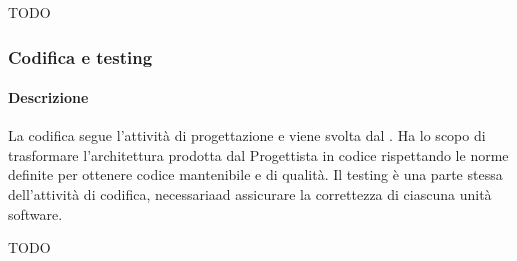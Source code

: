 TODO

\subsubsection{Codifica e testing}
\paragraph{Descrizione}
La codifica segue l'attività di progettazione e viene svolta dal . Ha lo scopo di trasformare l'architettura prodotta dal Progettista in codice rispettando le norme definite per ottenere codice mantenibile e di qualità. Il testing è una parte stessa dell'attività di codifica, necessariaad assicurare la correttezza di ciascuna unità software.


TODO
